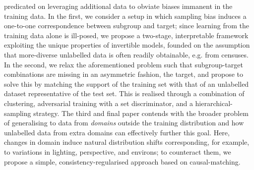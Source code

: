 predicated on leveraging additional data to obviate biases immanent in the training data.
%
In the first, we consider a setup in which sampling bias induces a one-to-one correspondence
between subgroup and target; since learning from the training data alone is ill-posed, we propose
a two-stage, interpretable framework exploiting the unique properties of invertible models, founded
on the assumption that more-diverse unlabelled data is often readily obtainable, e.g. from
censuses.
%
In the second, we relax the aforementioned problem such that subgroup-target combinations are
missing in an asymmetric fashion, \wrt{} the target, and propose to solve this by matching the
support of the training set with that of an unlabelled dataset representative of the test set. 
%
This is realised through a combination of clustering, adversarial training with a set
discriminator, and a hierarchical-sampling strategy.
%
The third and final paper contends with the broader problem of generalising to data from
\emph{domains} outside the training distribution  and how unlabelled data from extra domains can
effectively further this goal.
%
Here, changes in domain induce natural distribution shifts corresponding, for example, to
variations in lighting, perspective, and environs; to counteract them, we propose a simple,
consistency-regularised approach based on causal-matching.


\endgroup

\vfill
